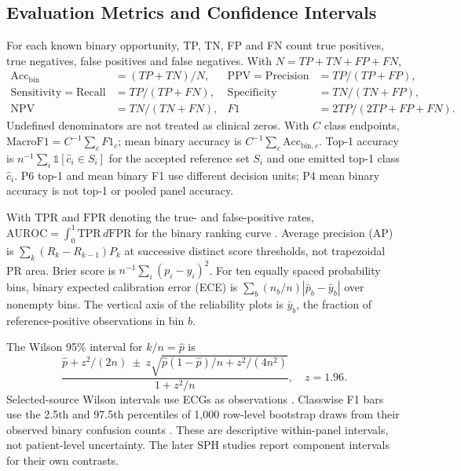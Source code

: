 \documentclass[life,article,submit,moreauthors]{Definitions/mdpi}
\begin{document}
\subsection{Evaluation Metrics and Confidence Intervals}


\label{sec:metrics}
For each known binary opportunity, TP, TN, FP and FN count true positives, true negatives, false positives and false negatives. With $N=TP+TN+FP+FN$,
\begin{align}
\mathrm{Acc}_{\mathrm{bin}}&=(TP+TN)/N,&
\mathrm{PPV}=\mathrm{Precision}&=TP/(TP+FP),\\
\mathrm{Sensitivity}=\mathrm{Recall}&=TP/(TP+FN),&
\mathrm{Specificity}&=TN/(TN+FP),\\
\mathrm{NPV}&=TN/(TN+FN),&
F1&=2TP/(2TP+FP+FN).
\end{align}
Undefined denominators are not treated as clinical zeros. With $C$ class endpoints, $\mathrm{MacroF1}=C^{-1}\sum_c F1_c$; mean binary accuracy is $C^{-1}\sum_c\mathrm{Acc}_{\mathrm{bin},c}$. Top-1 accuracy is $n^{-1}\sum_i\mathbb{1}[\hat c_i\in S_i]$ for the accepted reference set $S_i$ and one emitted top-1 class $\hat c_i$. P6 top-1 and mean binary F1 use different decision units; P4 mean binary accuracy is not top-1 or pooled panel accuracy.

With $\mathrm{TPR}$ and $\mathrm{FPR}$ denoting the true- and false-positive rates, $\mathrm{AUROC}=\int_0^1\mathrm{TPR}\,d\mathrm{FPR}$ for the binary ranking curve \citep{Hanley1982meaning}. Average precision (AP) is $\sum_k (R_k-R_{k-1})P_k$ at successive distinct score thresholds, not trapezoidal PR area. Brier score is $n^{-1}\sum_i(p_i-y_i)^2$. For ten equally spaced probability bins, binary expected calibration error (ECE) is $\sum_b(n_b/n)|\bar p_b-\bar y_b|$ over nonempty bins. The vertical axis of the reliability plots is $\bar y_b$, the fraction of reference-positive observations in bin $b$.

The Wilson 95\% interval for $k/n=\hat p$ is
\begin{equation}
\frac{\hat p+z^2/(2n)\ \pm\ z\sqrt{\hat p(1-\hat p)/n+z^2/(4n^2)}}{1+z^2/n},\quad z=1.96.
\end{equation}
Selected-source Wilson intervals use ECGs as observations \citep{Wilson1927Probable}. Classwise F1 bars use the 2.5th and 97.5th percentiles of 1,000 row-level bootstrap draws from their observed binary confusion counts \citep{Efron1979Bootstrap}. These are descriptive within-panel intervals, not patient-level uncertainty. The later SPH studies report component intervals for their own contrasts.
\end{document}
